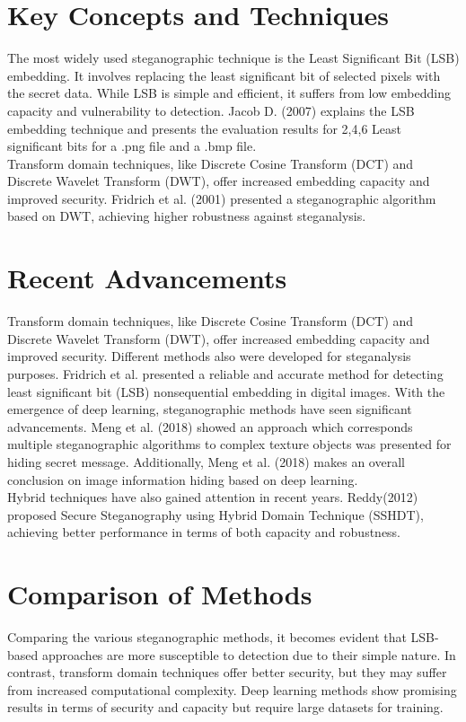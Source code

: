 \documentclass{report}
\begin{document}
\section{Key Concepts and Techniques}
The most widely used steganographic technique is the Least Significant Bit (LSB) embedding. It involves replacing the least significant bit of selected pixels with the secret data. While LSB is simple and efficient, it suffers from low embedding capacity and vulnerability to detection. Jacob D. (2007) explains the LSB embedding technique and presents the evaluation results for 2,4,6 Least significant bits for a .png file and a .bmp file.\cite{neeta2006implementation}\\
Transform domain techniques, like Discrete Cosine Transform (DCT) and Discrete Wavelet Transform (DWT), offer increased embedding capacity and improved security. Fridrich et al. (2001) presented a steganographic algorithm based on DWT, achieving higher robustness against steganalysis.\cite{fridrich2001detecting}\\
\section{Recent Advancements}
Transform domain techniques, like Discrete Cosine Transform (DCT) and Discrete Wavelet Transform (DWT), offer increased embedding capacity and improved security. Different methods also were developed for steganalysis purposes. Fridrich et al. presented a reliable and accurate method for detecting least significant bit (LSB) nonsequential embedding in digital images.\cite{fridrich2001detecting} With the emergence of deep learning, steganographic methods have seen significant advancements. Meng et al. (2018) showed an approach which corresponds multiple steganographic algorithms to complex texture objects was presented for hiding secret message.\cite{meng2018fusion} Additionally, Meng et al. (2018) makes an overall conclusion on image information hiding based on deep learning.\cite{meng2018survey}\\
Hybrid techniques have also gained attention in recent years. Reddy(2012) proposed Secure Steganography using Hybrid Domain Technique (SSHDT), achieving better performance in terms of both capacity and robustness.\cite{reddy2012secure}\\
\section{Comparison of Methods}
Comparing the various steganographic methods, it becomes evident that LSB-based approaches are more susceptible to detection due to their simple nature. In contrast, transform domain techniques offer better security, but they may suffer from increased computational complexity. Deep learning methods show promising results in terms of security and capacity but require large datasets for training.
\end{document}

